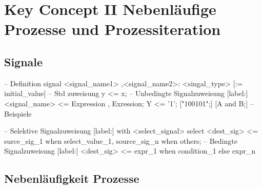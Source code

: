 \section{Key Concept II \tiny Nebenläufige Prozesse und Prozessiteration}

\subsection{Signale}

\begin{minipage}{0.01\textwidth}
	\text{ } %
\end{minipage}
\begin{minipage}{0.48\textwidth}
	\begin{VHDL}
--  Definition 
signal <signal_name1> {,<signal_name2>}: <singal_type> [:= initial_value]
-- Std zuweisung
y <= x;
-- Unbedingte Signalzuweisung 
[label:] <signal_name> <= Expression {, Exression};
Y <= '1'; ["100101";] [A and B;]	-- Beispiele
	\end{VHDL}
\end{minipage}
\begin{minipage}{0.02\textwidth}
	\text{ } %
\end{minipage}
\begin{minipage}{0.48\textwidth}
	\begin{VHDL}
-- Selektive Signalzuweisung
[label:] with <select_signal> select
	<dest_sig> <= 	{surce_sig_1 when select_value_1,}
					source_sig_n when others;
-- Bedingte Signalzuweisung
[label:] <dest_sig> <=	{expr_1 when condition_1 else}
						expr_n
	\end{VHDL}
\end{minipage}

\subsection{Nebenläufigkeit Prozesse}

